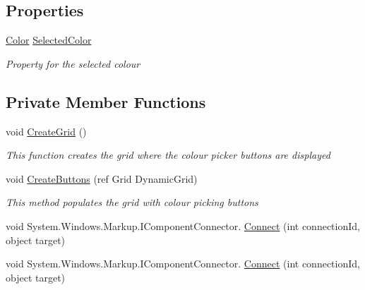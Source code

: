 \subsection*{Properties}
\begin{DoxyCompactItemize}
\item 
\hyperlink{_console_window_8xaml_8cs_adf2800823d988ace598d734fdec29975}{Color} \hyperlink{class_c_p_u___o_s___simulator_1_1_colour_picker_window_a4e51070f2e58d178bf773acb4200e76e}{Selected\+Color}
\begin{DoxyCompactList}\small\item\em Property for the selected colour \end{DoxyCompactList}\end{DoxyCompactItemize}
\subsection*{Private Member Functions}
\begin{DoxyCompactItemize}
\item 
void \hyperlink{class_c_p_u___o_s___simulator_1_1_colour_picker_window_aed4e40744fb046fb84cebd2c406b8a99}{Create\+Grid} ()
\begin{DoxyCompactList}\small\item\em This function creates the grid where the colour picker buttons are displayed \end{DoxyCompactList}\item 
void \hyperlink{class_c_p_u___o_s___simulator_1_1_colour_picker_window_a2969d055fb398db5c470dd91d89abffd}{Create\+Buttons} (ref Grid Dynamic\+Grid)
\begin{DoxyCompactList}\small\item\em This method populates the grid with colour picking buttons \end{DoxyCompactList}\item 
void System.\+Windows.\+Markup.\+I\+Component\+Connector. \hyperlink{class_c_p_u___o_s___simulator_1_1_colour_picker_window_a857b5ab5ebf06a29846e0595c3c442ad}{Connect} (int connection\+Id, object target)
\item 
void System.\+Windows.\+Markup.\+I\+Component\+Connector. \hyperlink{class_c_p_u___o_s___simulator_1_1_colour_picker_window_a857b5ab5ebf06a29846e0595c3c442ad}{Connect} (int connection\+Id, object target)
\end{DoxyCompactItemize}
